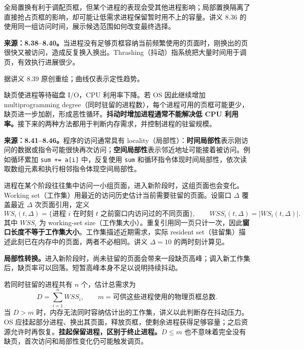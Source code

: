 全局置换有利于调配页框，但某个进程的表现会受其他进程影响；局部置换隔离了直接抢占页框的影响，却可能让低需求进程保留暂时用不上的容量。讲义 8.36 的使用同一组访问时间，展示候选范围如何改变最终选择。


\textbf{来源：8.38--8.40。}当进程没有足够页框容纳当前频繁使用的页面时，刚换出的页很快又被访问，造成反复换入换出。Thrashing（抖动）指系统把大量时间用于调页，有效执行进展很少。

\begin{center}


{\small 据讲义 8.39 原创重绘；曲线仅表示定性趋势。}
\end{center}

缺页使进程等待磁盘 I/O，CPU 利用率下降。若 OS 因此继续增加 multiprogramming degree（同时驻留的进程数），每个进程可用的页框可能更少，缺页进一步加剧，形成恶性循环。\textbf{抖动时增加进程通常不能解决低 CPU 利用率。}接下来的两种方法都用于判断内存需求，并控制进程的驻留规模。


\textbf{来源：8.41--8.46。}程序的访问通常具有 locality（局部性）：\textbf{时间局部性}表示刚访问的数据或指令可能很快再次访问；\textbf{空间局部性}表示邻近地址可能接着被访问。例如循环累加 \texttt{sum += a[i]} 中，反复使用 \texttt{sum} 和循环指令体现时间局部性，依次读取数组元素和执行相邻指令体现空间局部性。

进程在某个阶段往往集中访问一小组页面，进入新阶段时，这组页面也会变化。Working set（工作集）用最近的访问历史估计当前需要驻留的页面。设窗口 $\Delta$ 覆盖最近 $\Delta$ 次页面引用，定义
\[
  WS_i(t,\Delta)=\{\text{进程 }i\text{ 在时刻 }t\text{ 之前窗口内访问过的不同页面}\},
  \qquad WSS_i(t,\Delta)=|WS_i(t,\Delta)|.
\]
其中 $WSS_i$ 为 working-set size（工作集大小）。重复引用同一页只计一次，因此\textbf{窗口长度不等于工作集大小}。工作集描述近期需求，实际 resident set（驻留集）描述此刻已在内存中的页面，两者不必相同。讲义 $\Delta=10$ 的两时刻计算见。

\textbf{局部性转换。}进入新阶段时，尚未驻留的页面会带来一段缺页高峰；调入新工作集后，缺页率可以回落。短暂高峰本身不足以说明持续抖动。

若同时驻留的进程共有 $n$ 个，估计总需求为
\[
  D=\sum_{i=1}^{n}WSS_i,\qquad m=\text{可供这些进程使用的物理页框总数}.
\]
当 $D>m$ 时，内存无法同时容纳估计出的工作集，讲义以此判断存在抖动压力。OS 应挂起部分进程、换出其页面，释放页框，使剩余进程获得足够容量；之后资源允许时再恢复。\textbf{挂起保留进程，区别于终止进程。}$D\leq m$ 也不意味着完全没有缺页，首次访问和局部性变化仍可能触发调页。

